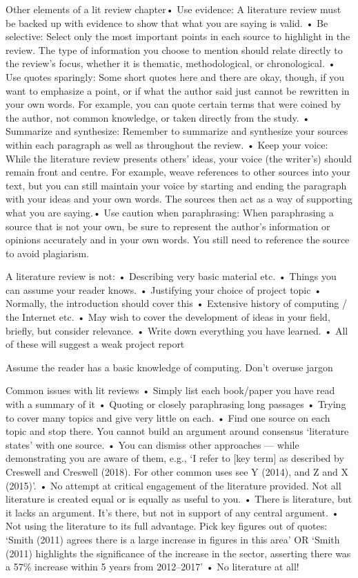 {    Other elements of a lit review chapter• Use evidence: A literature review must be backed up with evidence to show that what you are saying is valid.
    • Be selective: Select only the most important points in each source to highlight in the review. The type of information you choose to mention should relate
    directly to the review's focus, whether it is thematic, methodological, or chronological.
    • Use quotes sparingly: Some short quotes here and there are okay, though, if you want to emphasize a point, or if what the author said just cannot be rewritten in your own words.
    For example, you can quote certain terms that were coined by the author, not common knowledge, or taken directly from the study.
    • Summarize and synthesize: Remember to summarize and synthesize your sources within
    each paragraph as well as throughout the review.
    • Keep your voice: While the literature review presents others' ideas, your voice (the writer's) should remain front and centre.
    For example, weave references to other sources into your text, but you can still maintain your voice by starting and ending the paragraph with your ideas and
    your own words. The sources then act as a way of supporting what you are saying.• Use caution when paraphrasing: When paraphrasing a source that is not your own, be sure to
    represent the author's information or opinions accurately and in your own words. You still need to reference the source to avoid plagiarism.

    A literature review is not:
    • Describing very basic material etc.
    • Things you can assume your reader knows.
    • Justifying your choice of project topic
    • Normally, the introduction should cover this
    • Extensive history of computing / the Internet etc.
    • May wish to cover the development of ideas in your field, briefly, but consider relevance.
    • Write down everything you have learned.
    • All of these will suggest a weak project report

    Assume the reader has a basic knowledge of computing. Don't overuse jargon

    Common issues with lit reviews
    • Simply list each book/paper you have read with a summary of it
    • Quoting or closely paraphrasing long passages
    • Trying to cover many topics and give very little on each.
    • Find one source on each topic and stop there. You cannot build an argument around consensus \enquote*{literature states} with one source.
    • You can dismiss other approaches --- while demonstrating you are aware of them, e.g., \enquote*{I refer to [key term] as described by Creswell and Creswell (2018). For other common uses see Y (2014), and Z and X (2015)}.
    • No attempt at critical engagement of the literature provided. Not all literature is created equal or is equally as useful to you.
    • There is literature, but it lacks an argument. It's there, but not in support of any central argument.
    • Not using the literature to its full advantage. Pick key figures out of quotes:
    \enquote*{Smith (2011) agrees there is a large increase in figures in this area} OR
    \enquote*{Smith (2011) highlights the significance of the increase in the sector, asserting there was a 57\% increase within 5 years from 2012--2017}
    • No literature at all!

}
